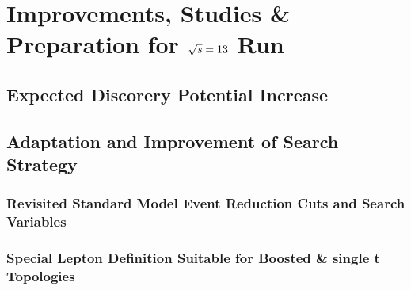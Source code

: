 % 
% 
% 


\chapter{Improvements, Studies \& Preparation for $\sqrt{s}=13$ \tev Run}
\label{sec:Lost_Lepton_13TeV}

\section{Expected Discorery Potential Increase}

\section{Adaptation and Improvement of Search Strategy}
\subsection{Revisited Standard Model Event Reduction Cuts and Search Variables}
\label{sec:Lost_Lepton_13TeV_SearchStrategy}
\subsection{Special Lepton Definition Suitable for Boosted \ttbar \& single t Topologies}
\label{sec:Lost_Lepton_13TeV_BoostRegion}
